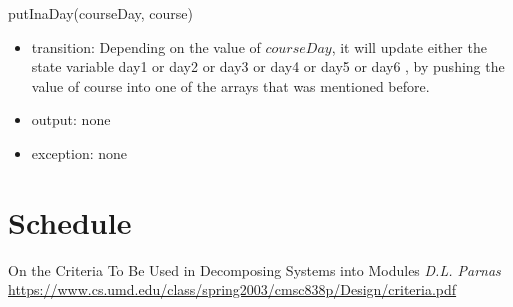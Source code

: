 \documentclass[11pt, oneside]{article}
\begin{document}
\noindent
putInaDay(courseDay, course)
\begin{itemize}
\item transition: Depending on the value of $courseDay$, it will update either the state variable day1 or day2 or day3 or day4 or day5 or day6 , by pushing the value of course into one of the arrays that was mentioned before.
\item output: none
\item exception: none
\end{itemize}


\newpage
\section{Schedule}



\newpage
\begin{thebibliography}{9}
On the Criteria To Be Used in Decomposing Systems into Modules 
\textit{D.L. Parnas}
\url{https://www.cs.umd.edu/class/spring2003/cmsc838p/Design/criteria.pdf}


 
\end{thebibliography}
\end{document}
